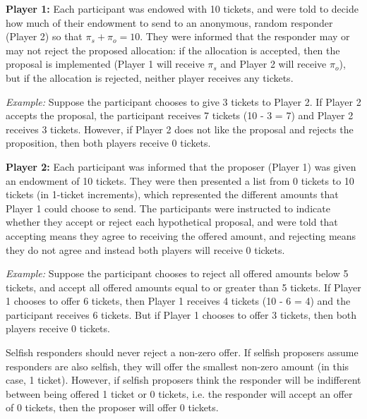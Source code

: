 \documentclass[12pt]{article}
\begin{document}
\textbf{Player 1:} Each participant was endowed with 10 tickets, and were told to decide how much of their endowment to send to an anonymous, random responder (Player 2) so that \(\pi_{s} + \pi_{o} = 10\). They were informed that the responder may or may not reject the proposed allocation: if the allocation is accepted, then the proposal is implemented (Player 1 will receive \(\pi_{s}\) and Player 2 will receive \(\pi_{o}\)), but if the allocation is rejected, neither player receives any tickets.

\textit{Example:} Suppose the participant chooses to give 3 tickets to Player 2. If Player 2 accepts the proposal, the participant receives 7 tickets (10 - 3 = 7) and Player 2 receives 3 tickets. However, if Player 2 does not like the proposal and rejects the proposition, then both players receive 0 tickets.
 
\textbf{Player 2:} Each participant was informed that the proposer (Player 1) was given an endowment of 10 tickets. They were then presented a list from 0 tickets to 10 tickets (in 1-ticket increments), which represented the different amounts that Player 1 could choose to send. The participants were instructed to indicate whether they accept or reject each hypothetical proposal, and were told that accepting means they agree to receiving the offered amount, and rejecting means they do not agree and instead both players will receive 0 tickets.

\textit{Example:} Suppose the participant chooses to reject all offered amounts below 5 tickets, and accept all offered amounts equal to or greater than 5 tickets. If Player 1 chooses to offer 6 tickets, then Player 1 receives 4 tickets (10 - 6 = 4) and the participant receives 6 tickets. But if Player 1 chooses to offer 3 tickets, then both players receive 0 tickets. 

Selfish responders should never reject a non-zero offer. If selfish proposers assume responders are also selfish, they will offer the smallest non-zero amount (in this case, 1 ticket). However, if selfish proposers think the responder will be indifferent between being offered 1 ticket or 0 tickets, i.e. the responder will accept an offer of 0 tickets, then the proposer will offer 0 tickets.

\end{document}
